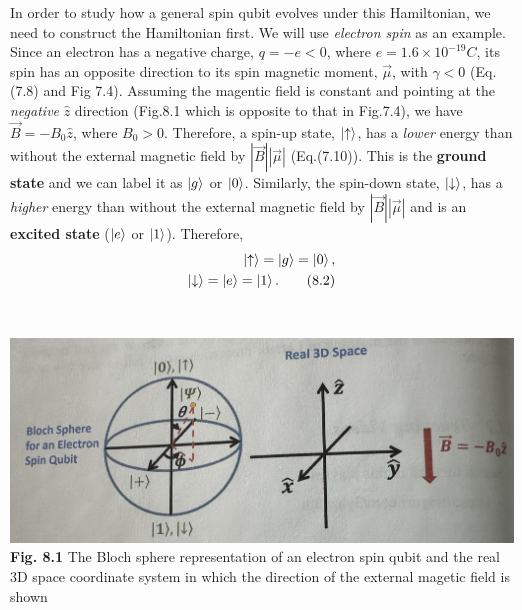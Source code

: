 \documentclass{article}
\begin{document}
In order to study how a general spin qubit evolves under this Hamiltonian,
we need to construct the Hamiltonian first. We will use \textit{electron spin}
as an example. Since an electron has a negative charge, $q=-e<0$, where $e=1.6\times10^{-19}C$,
its spin has an opposite direction to its spin magnetic moment, $\vec{\mu}$, with
$\gamma<0$ (Eq.(7.8) and Fig 7.4). Assuming the magentic field is constant and pointing at the 
\textit{negative} $\hat{z}$ direction (Fig.8.1 which is opposite to that in Fig.7.4), we have
$\vec{B}=-B_0\hat{z}$, where $B_0>0$. Therefore, a spin-up state, $\ket{\uparrow}$,
has a \textit{lower} energy than without the external magnetic field by
$|\vec{B}||\vec{\mu}|$ (Eq.(7.10)). This is the \textbf{ground state} and we can
label it as $\ket{g}$ or $\ket{0}$. Similarly, the spin-down state, $\ket{\downarrow}$, has a 
\textit{higher} energy than without the external magnetic field by $|\vec{B}||\vec{\mu}|$
and is an \textbf{excited state} ($\ket{e}$ or $\ket{1}$). Therefore,
\begin{align*}\label{eq 8.2}
    \ket{\uparrow}=\ket{g}=\ket{0},\\
    \ket{\downarrow}=\ket{e}=\ket{1}.\tag{8.2}
\end{align*}\\\\

\includegraphics[scale=0.4]{Fig.8.1.jpeg}\\
\textbf{Fig. 8.1} The Bloch sphere representation of an electron spin
qubit and the real 3D space coordinate system in which the direction of the external
magetic field is shown\\
\end{document}
